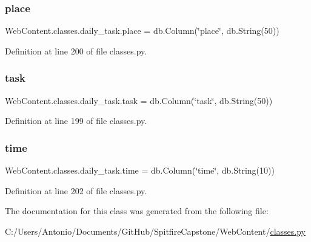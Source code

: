 \mbox{\label{class_web_content_1_1classes_1_1daily__task_acd856b954382e792e6e5c28fd830121e}} 
\subsubsection{\texorpdfstring{place}{place}}
{\footnotesize\ttfamily Web\+Content.\+classes.\+daily\+\_\+task.\+place = db.\+Column(\char`\"{}place\char`\"{}, db.\+String(50))\hspace{0.3cm}{\ttfamily [static]}}



Definition at line 200 of file classes.\+py.

\mbox{\label{class_web_content_1_1classes_1_1daily__task_aafd4c49d7d757e26f13bf61a4e6aa875}} 
\subsubsection{\texorpdfstring{task}{task}}
{\footnotesize\ttfamily Web\+Content.\+classes.\+daily\+\_\+task.\+task = db.\+Column(\char`\"{}task\char`\"{}, db.\+String(50))\hspace{0.3cm}{\ttfamily [static]}}



Definition at line 199 of file classes.\+py.

\mbox{\label{class_web_content_1_1classes_1_1daily__task_ad2c51b720cec786c89d5742e03b240ca}} 
\subsubsection{\texorpdfstring{time}{time}}
{\footnotesize\ttfamily Web\+Content.\+classes.\+daily\+\_\+task.\+time = db.\+Column(\char`\"{}time\char`\"{}, db.\+String(10))\hspace{0.3cm}{\ttfamily [static]}}



Definition at line 202 of file classes.\+py.



The documentation for this class was generated from the following file\+:\begin{DoxyCompactItemize}
\item 
C\+:/\+Users/\+Antonio/\+Documents/\+Git\+Hub/\+Spitfire\+Capstone/\+Web\+Content/\hyperlink{classes_8py}{classes.\+py}\end{DoxyCompactItemize}
